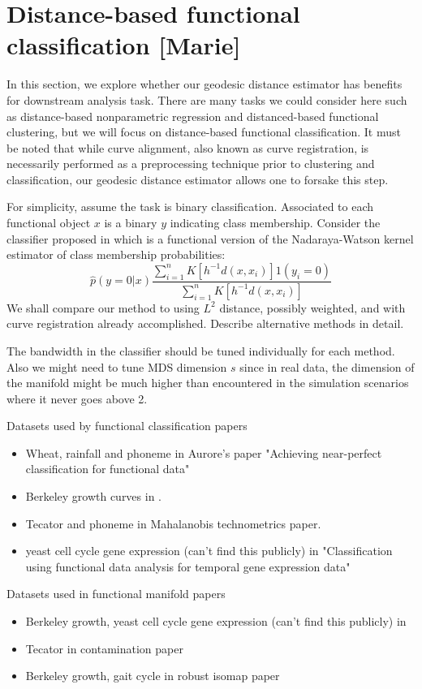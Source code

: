 \section{Distance-based functional classification
{[}Marie{]}}\label{distance-based-functional-classification-marie}

In this section, we explore whether our geodesic distance estimator has
benefits for downstream analysis task. There are many tasks we could
consider here such as distance-based nonparametric regression and
distanced-based functional clustering, but we will focus on
distance-based functional classification. It must be noted that while
curve alignment, also known as curve registration, is necessarily
performed as a preprocessing technique prior to clustering and
classification, our geodesic distance estimator allows one to forsake
this step.

For simplicity, assume the task is binary classification. Associated to
each functional object \(x\) is a binary \(y\) indicating class
membership. Consider the classifier proposed in \cite{Ferraty2006} which
is a functional version of the Nadaraya-Watson kernel estimator of class
membership probabilities: \[
\hat p(y = 0 | x) \frac{ \sum_{i=1}^n K[h^{-1} d(x,x_i)] 1(y_i = 0) }{ \sum_{i=1}^n K[h^{-1} d(x,x_i)] }
\] We shall compare our method to using \(L^2\) distance, possibly
weighted, and with curve registration already accomplished. Describe
alternative methods in detail.

The bandwidth in the classifier should be tuned individually for each
method. Also we might need to tune MDS dimension \(s\) since in real
data, the dimension of the manifold might be much higher than
encountered in the simulation scenarios where it never goes above 2.

Datasets used by functional classification papers

\begin{itemize}
\item Wheat, rainfall and phoneme in Aurore's paper "Achieving near-perfect classification for functional data"
\item Berkeley growth curves in \cite{ChenReiss2014}.
\item Tecator and phoneme in \cite{Galeano2015} Mahalanobis technometrics paper.
\item yeast cell cycle gene expression (can't find this publicly) in \cite{LengMuller2005} "Classification using functional data analysis for temporal gene expression data"
\end{itemize}

Datasets used in functional manifold papers

\begin{itemize}
\item Berkeley growth, yeast cell cycle gene expression (can't find this publicly) in \cite{ChenMuller2012}
\item Tecator in \cite{LinYao2017} contamination paper
\item Berkeley growth, gait cycle in \cite{Dimeglio2014} robust isomap paper
\end{itemize}
